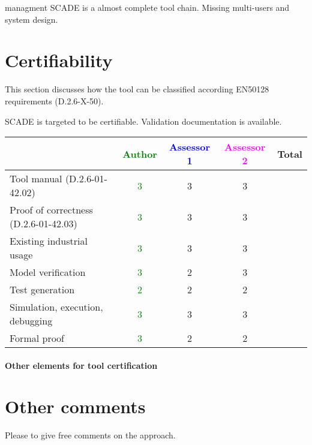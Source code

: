 \begin{assessor2}managment
SCADE is a almost complete tool chain. Missing multi-users and system design.
\end{assessor2}
\section{Certifiability}

This section discusses how the tool can be classified according EN50128 requirements (D.2.6-X-50).

\begin{author_comment}
SCADE is targeted to be certifiable. Validation documentation is available.   
\end{author_comment}


\begin{tabular}{|l | c | c | c | c|}
\hline
& \textcolor{green}{Author} & \textcolor{blue}{Assessor 1} & \textcolor{magenta}{Assessor 2} & Total \\
\hline 
Tool manual (D.2.6-01-42.02) & \textcolor{green}{3} & 3 &3 &  \\
\hline
Proof of correctness (D.2.6-01-42.03)   & \textcolor{green}{3} & 3 &3 & \\
\hline
Existing industrial  usage  & \textcolor{green}{3} & 3 &3 & \\
\hline
Model verification & \textcolor{green}{3} & 2 &3 & \\
\hline
Test generation & \textcolor{green}{2} & 2 &2 & \\
\hline
Simulation, execution, debugging & \textcolor{green}{3} & 3 &3 & \\
\hline
Formal proof & \textcolor{green}{3} & 2 &2 & \\
\hline
\end{tabular}

\paragraph{Other elements for tool certification}

\section{Other comments}
Please to  give free comments on the approach.




